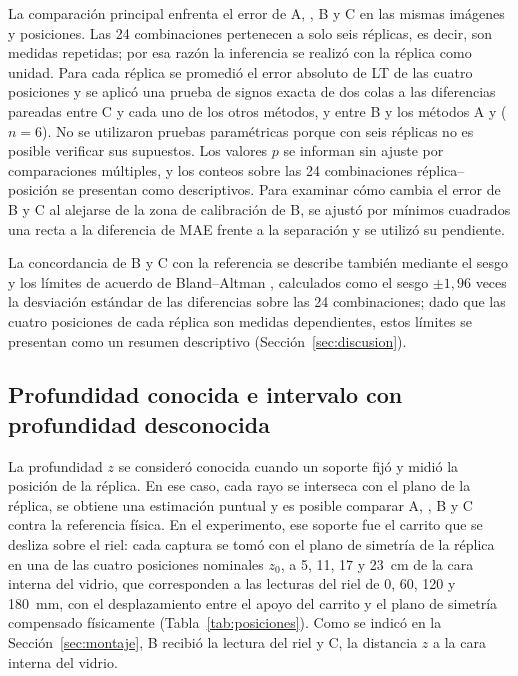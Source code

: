 La comparación principal enfrenta el error de A, \Aprime, B y C en las mismas imágenes y posiciones. Las 24 combinaciones pertenecen a solo seis réplicas, es decir, son medidas repetidas; por esa razón la inferencia se realizó con la réplica como unidad. Para cada réplica se promedió el error absoluto de LT de las cuatro posiciones y se aplicó una prueba de signos exacta de dos colas a las diferencias pareadas entre C y cada uno de los otros métodos, y entre B y los métodos A y \Aprime{} ($n = 6$). No se utilizaron pruebas paramétricas porque con seis réplicas no es posible verificar sus supuestos. Los valores $p$ se informan sin ajuste por comparaciones múltiples, y los conteos sobre las 24 combinaciones réplica--posición se presentan como descriptivos. Para examinar cómo cambia el error de B y C al alejarse de la zona de calibración de B, se ajustó por mínimos cuadrados una recta a la diferencia de MAE frente a la separación y se utilizó su pendiente.

La concordancia de B y C con la referencia se describe también mediante el sesgo y los límites de acuerdo de Bland--Altman \parencite{Bland1986}, calculados como el sesgo $\pm 1{,}96$ veces la desviación estándar de las diferencias sobre las 24 combinaciones; dado que las cuatro posiciones de cada réplica son medidas dependientes, estos límites se presentan como un resumen descriptivo (Sección~\ref{sec:discusion}).

\subsection{Profundidad conocida e intervalo con profundidad desconocida}
\label{sec:intervalo-metodo}

La profundidad $z$ se consideró conocida cuando un soporte fijó y midió la posición de la réplica. En ese caso, cada rayo se interseca con el plano de la réplica, se obtiene una estimación puntual y es posible comparar A, \Aprime, B y C contra la referencia física. En el experimento, ese soporte fue el carrito que se desliza sobre el riel: cada captura se tomó con el plano de simetría de la réplica en una de las cuatro posiciones nominales $z_0$, a 5, 11, 17 y 23~cm de la cara interna del vidrio, que corresponden a las lecturas del riel de 0, 60, 120 y 180~mm, con el desplazamiento entre el apoyo del carrito y el plano de simetría compensado físicamente (Tabla~\ref{tab:posiciones}). Como se indicó en la Sección~\ref{sec:montaje}, B recibió la lectura del riel y C, la distancia $z$ a la cara interna del vidrio.

